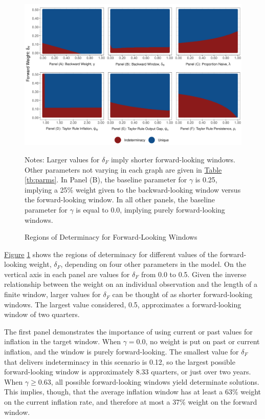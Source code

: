 \documentclass[english,authoryear,12pt]{elsarticle}
\begin{document}
\begin{figure}
	\captionsetup{justification=centering}
	\begin{center}
		\includegraphics[width=\textwidth]{./determinacy_notitle.png}
		\vspace*{3pc}\hspace*{2pc}\parbox{0.9\textwidth}{\small{
			Notes: Larger values for $\delta_F$ imply shorter forward-looking windows. Other parameters not varying in each graph are given in \href{tb:parms}{Table} \ref{tb:parms}. In Panel (B), the baseline parameter for $\gamma$ is 0.25, implying a 25\% weight given to the backward-looking window versus the forward-looking window. In all other panels, the baseline parameter for $\gamma$ is equal to 0.0, implying purely forward-looking windows.}
		}
	\end{center}
	\vspace*{-4pc}\caption{Regions of Determinacy for Forward-Looking Windows}\label{fg:determinacy}
\end{figure}

\href{fg:determinacy}{Figure} \ref{fg:determinacy} shows the regions of determinacy for different values of the forward-looking weight, $\delta_F$, depending on four other parameters in the model. On the vertical axis in each panel are values for $\delta_F$ from 0.0 to 0.5. Given the inverse relationship between the weight on an individual observation and the length of a finite window, larger values for $\delta_F$ can be thought of as shorter forward-looking windows. The largest value considered, 0.5, approximates a forward-looking window of two quarters.

The first panel demonstrates the importance of using current or past values for inflation in the target window. When $\gamma=0.0$, no weight is put on past or current inflation, and the window is purely forward-looking. The smallest value for $\delta_F$ that delivers indeterminacy in this scenario is 0.12, so the largest possible forward-looking window is approximately 8.33 quarters, or just over two years. When $\gamma \geq 0.63$, all possible forward-looking windows yield determinate solutions. This implies, though, that the average inflation window has at least a 63\% weight on the current inflation rate, and therefore at most a 37\% weight on the forward window.
\end{document}
